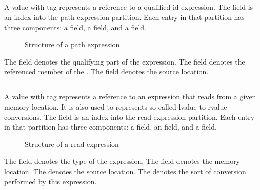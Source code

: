 

\subsection{}
\label{sec:ifc:ExprSort:Path}

A  value with tag  represents
a reference to a qualified-id expression. 
The  field is an index into the path expression partition.
Each entry in that partition has three components: a  field, a  field, and a  field.
%
\begin{figure}[H]
	\centering
	\caption{Structure of a path expression}
	\label{fig:ifc-path-expression-structure}
\end{figure}
%
The  field denotes the qualifying part of the expression.
The  field denotes the referenced member of the .
The  field denotes the source location.



\subsection{}
\label{sec:ifc:ExprSort:Read}

A  value with tag  represents
a reference to an expression that reads from a given memory location.
It is also used to represents so-called lvalue-to-rvalue conversions.
The  field is an index into the read expression partition.
Each entry in that partition has three components: a  field, an  field, and a  field.
%
\begin{figure}[H]
	\centering
	\caption{Structure of a read expression}
	\label{fig:ifc-read-expression-structure}
\end{figure}
%
The  field denotes the type of the expression.
The  field denotes the memory location.
The  denotes the source location.
The  denotes the sort of conversion performed by this expression.

